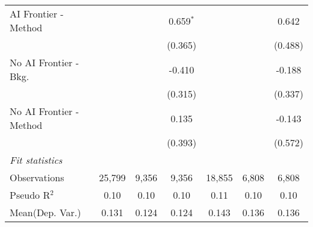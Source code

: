 \begin{tabular}{lcccccc}
   AI Frontier - Method    &               &               & 0.659$^{*}$   &               &               & 0.642\\   
                           &               &               & (0.365)       &               &               & (0.488)\\   
   No AI Frontier - Bkg.   &               &               & -0.410        &               &               & -0.188\\   
                           &               &               & (0.315)       &               &               & (0.337)\\   
   No AI Frontier - Method &               &               & 0.135         &               &               & -0.143\\   
                           &               &               & (0.393)       &               &               & (0.572)\\   
   \midrule
   \emph{Fit statistics}\\
   Observations            & 25,799        & 9,356         & 9,356         & 18,855        & 6,808         & 6,808\\  
   Pseudo R$^2$            & 0.10          & 0.10          & 0.10          & 0.11          & 0.10          & 0.10\\  
Mean(Dep. Var.) & 0.131 & 0.124 & 0.124 & 0.143 & 0.136 & 0.136 \\
   

\end{tabular}
